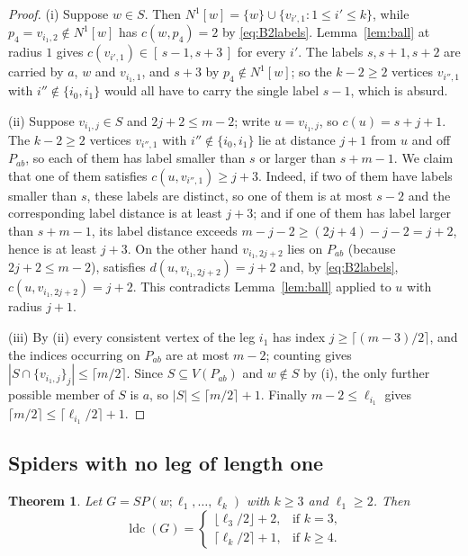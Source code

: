 \documentclass[reqno,10pt]{article}
\newtheorem{theorem}{Theorem}
\theoremstyle{definition}
\numberwithin{equation}{section}
\numberwithin{theorem}{section}
\newcommand{\ldc}{\operatorname{ldc}}
\newcommand{\Ball}[2]{N^{#2}[#1]}
\begin{document}
\begin{proof}
(i) Suppose $w\in S$. Then $\Ball{w}{1}=\{w\}\cup\{v_{i',1}:1\le i'\le k\}$,
while $p_4=v_{i_1,2}\notin\Ball{w}{1}$ has $c(w,p_4)=2$ by
\eqref{eq:B2labels}. Lemma~\ref{lem:ball} at radius $1$ gives
$c(v_{i',1})\in[\,s-1,s+3\,]$ for every $i'$. The labels $s,s+1,s+2$ are
carried by $a$, $w$ and $v_{i_1,1}$, and $s+3$ by $p_4\notin\Ball{w}{1}$; so the
$k-2\ge2$ vertices $v_{i'',1}$ with $i''\notin\{i_0,i_1\}$ would all have to
carry the single label $s-1$, which is absurd.

\medskip
\noindent(ii) Suppose $v_{i_1,j}\in S$ and $2j+2\le m-2$; write $u=v_{i_1,j}$,
so $c(u)=s+j+1$. The $k-2\ge2$ vertices $v_{i'',1}$ with
$i''\notin\{i_0,i_1\}$ lie at distance $j+1$ from $u$ and off $P_{ab}$, so each
of them has label smaller than $s$ or larger than $s+m-1$. We claim that one of
them satisfies $c(u,v_{i'',1})\ge j+3$. Indeed, if two of them have labels
smaller than $s$, these labels are distinct, so one of them is at most $s-2$ and
the corresponding label distance is at least $j+3$; and if one of them has label
larger than $s+m-1$, its label distance exceeds $m-j-2\ge(2j+4)-j-2=j+2$, hence
is at least $j+3$. On the other hand $v_{i_1,2j+2}$ lies on $P_{ab}$ (because
$2j+2\le m-2$), satisfies $d(u,v_{i_1,2j+2})=j+2$ and, by
\eqref{eq:B2labels}, $c(u,v_{i_1,2j+2})=j+2$. This contradicts
Lemma~\ref{lem:ball} applied to $u$ with radius $j+1$.

\medskip
\noindent(iii) By (ii) every consistent vertex of the leg $i_1$ has index
$j\ge\lceil (m-3)/2\rceil$, and the indices occurring on $P_{ab}$ are at most
$m-2$; counting gives
$|S\cap\{v_{i_1,j}\}_{j}|\le\lceil m/2\rceil$. Since $S\subseteq V(P_{ab})$ and
$w\notin S$ by (i), the only further possible member of $S$ is $a$, so
$|S|\le\lceil m/2\rceil+1$. Finally $m-2\le \ell_{i_1}$ gives
$\lceil m/2\rceil\le\lceil \ell_{i_1}/2\rceil+1$.
\end{proof}

\subsection{Spiders with no leg of length one}

\begin{theorem}
\label{thm:spiderlong}
Let $G=SP(w;\ell_1,\dots,\ell_k)$ with $k\ge3$ and $\ell_1\ge2$. Then
\[
  \ldc(G)=
  \begin{cases}
    \bigl\lfloor \ell_3/2\bigr\rfloor+2, & \text{if } k=3,\\[2pt]
    \bigl\lceil \ell_k/2\bigr\rceil+1, & \text{if } k\ge4 .
  \end{cases}
\]
\end{theorem}
\end{document}
